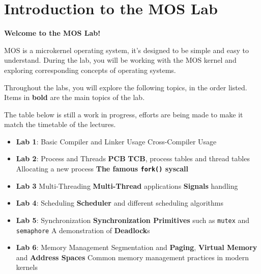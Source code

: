 \chapter*{Introduction to the MOS Lab}

\textbf{Welcome to the MOS Lab!}

MOS is a microkernel operating system, it's designed to be simple and easy to understand.
During the lab, you will be working with the MOS kernel and exploring corresponding concepts of
operating systems.

Throughout the labs, you will explore the following topics, in the order listed. Items in
\textbf{bold} are the main topics of the lab.

\begin{warning}
    \item The table below is still a work in progress, efforts are being made to make it match the
    timetable of the lectures.
\end{warning}

\begin{itemize}
    \item \textbf{Lab 1}: Basic Compiler and Linker Usage
          \subitem Cross-Compiler Usage
    \item \textbf{Lab 2}: Process and Threads
          \subitem \textbf{PCB} \textbf{TCB}, process tables and thread tables
          \subitem Allocating a new process
          \subitem \textbf{The famous \texttt{fork()} syscall}
    \item \textbf{Lab 3} Multi-Threading
          \subitem \textbf{Multi-Thread} applications
          \subitem \textbf{Signals} handling
    \item \textbf{Lab 4}: Scheduling
          \subitem \textbf{Scheduler} and different scheduling algorithms
    \item \textbf{Lab 5}: Synchronization
          \subitem \textbf{Synchronization Primitives} such as \texttt{mutex} and \texttt{semaphore}
          \subitem A demonstration of \textbf{Deadlock}s
    \item \textbf{Lab 6}: Memory Management
          \subitem Segmentation and \textbf{Paging}, \textbf{Virtual Memory} and \textbf{Address Spaces}
          \subitem Common memory management practices in modern kernels
\end{itemize}
